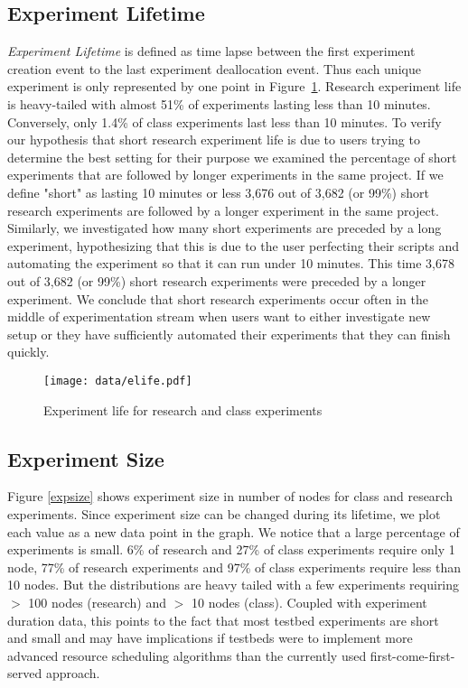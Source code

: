 \documentclass[12pt]{article}
\begin{document}
\subsection*{Experiment Lifetime}
{\it Experiment Lifetime} is defined as 
 time lapse between the first experiment creation
event to the last experiment deallocation event. 
Thus each unique experiment is only represented by one point in 
Figure~\ref{explife}. 
Research experiment life is heavy-tailed with almost
51\% of experiments lasting less than 10 minutes. Conversely, only 1.4\%
of class experiments last less than 10 minutes. To verify our hypothesis
that short research experiment life is due to users trying to determine
the best setting for their purpose we examined the percentage of short
experiments that are followed by longer experiments in the same project.
If we define "short" as lasting 10 minutes or less  3,676 out of 3,682
(or 99\%) short research experiments are followed by a longer experiment
in the same project. Similarly, we investigated how many short
experiments are preceded by a long experiment, hypothesizing that this
is due to the user perfecting their scripts and automating the
experiment so that it can run under 10 minutes. This time  3,678 out of
3,682 (or 99\%) short research experiments were preceded by a longer
experiment. We conclude that short research experiments occur often in
the middle of experimentation stream when users want to either
investigate new setup or they have sufficiently automated their
experiments that they can finish quickly.

\begin{figure}[htbp]
\begin{center}
\texttt{[image: data/elife.pdf]}
\caption{Experiment life for research and class experiments}
\label{explife}
\end{center}
\end{figure}


\subsection*{Experiment Size} 
Figure \ref{expsize} shows experiment size in number of nodes for class
and research experiments. Since experiment size can be changed during
its lifetime, we plot each value as a new data point in the graph. We
notice that a large percentage of experiments is small. 6\% of research
and 27\% of class experiments require only 1 node, 77\% of research
experiments and 97\% of class experiments require less than 10 nodes.
But the distributions are heavy tailed with a few experiments requiring
$>$ 100 nodes (research) and $>$ 10 nodes (class). Coupled with
experiment duration data, this points to the fact that most testbed
experiments are short and small and may have implications if testbeds
were to implement more advanced resource scheduling algorithms than the
currently used first-come-first-served approach.
\end{document}
